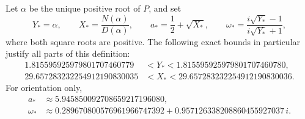 Let $\alpha$ be the unique positive root of $P$, and set
\begin{equation}\label{stalg:point}
 Y_* = \alpha,\qquad X_* = \frac{N(\alpha)}{D(\alpha)},\qquad
 a_* = \frac12+\sqrt{X_*},\qquad
 \omega_* = \frac{i\sqrt{Y_*}-1}{i\sqrt{Y_*}+1},
\end{equation}
where both square roots are positive.  The following exact bounds in
particular justify all parts of this definition:
\begin{align}
 1.815595925979801707460779
       &<Y_*<1.815595925979801707460780,\label{stalg:Y-box}\\
 29.657283232254912190830035
       &<X_*<29.657283232254912190830036.\label{stalg:X-box}
\end{align}
For orientation only,
\begin{align*}
 a_*&\approx5.945850092708659217196080,\\
 \omega_*&\approx0.289670800576961966747392
                  +0.957126338208860455927037\,i.
\end{align*}

